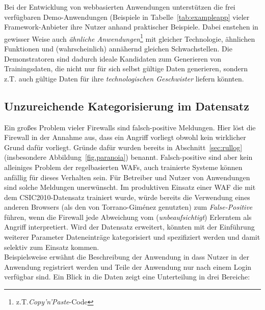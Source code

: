 \subsubsection{}
Bei der Entwicklung von webbasierten Anwendungen unterstützen die frei verfügbaren Demo-Anwendungen (Beispiele in Tabelle~\ref{tab:exampleapp} vieler Framework-Anbieter ihre Nutzer anhand praktischer Beispiele. Dabei enstehen in gewisser Weise auch \emph{ähnliche Anwendungen}\footnote{z.T.\emph{Copy'n'Paste}-Code} mit gleicher Technologie, ähnlichen Funktionen und (wahrscheinlich) annähernd gleichen Schwachstellen. Die Demonstratoren sind dadurch ideale Kandidaten zum Generieren von Trainingsdaten, die nicht nur für sich selbst gültige Daten generieren, sondern z.T. auch gültige Daten für ihre \glqq\emph{technologischen Geschwister}\glqq{} liefern könnten.


\subsection{Unzureichende Kategorisierung im Datensatz}
\label{sec:Kategorisierung}
Ein großes Problem vieler Firewalls sind falsch-positive Meldungen. Hier löst die Firewall in der Annahme aus, dass ein Angriff vorliegt obwohl kein wirklicher Grund dafür vorliegt. Gründe dafür wurden bereits in Abschnitt~\ref{sec:rullog} (insbesondere Abbildung~\ref{fig.paranoia}) benannt. Falsch-positive sind aber kein alleiniges Problem der regelbasierten WAFs, auch trainierte Systeme können anfällig für dieses Verhalten sein. Für Betreiber und Nutzer von Anwendungen sind solche Meldungen unerwünscht. Im produktiven Einsatz einer WAF die mit dem CSIC2010-Datensatz trainiert wurde, würde bereits die Verwendung eines anderen Browsers (als den von Torrano-Giménez genutzten) zum \emph{False-Positive} führen, wenn die Firewall jede Abweichung vom (\emph{unbeaufsichtigt}) Erlerntem als Angriff interpretiert. Wird der Datensatz erweitert, könnten mit der Einführung weiterer Parameter Dateneinträge kategorisiert und spezifiziert werden und damit selektiv zum Einsatz kommen.\\ Beispielsweise erwähnt die Beschreibung der Anwendung in \cite{csic2010} dass Nutzer in der Anwendung registriert werden und Teile der Anwendung nur nach einem Login verfügbar sind. Ein Blick in die Daten zeigt eine Unterteilung in drei Bereiche: \\

